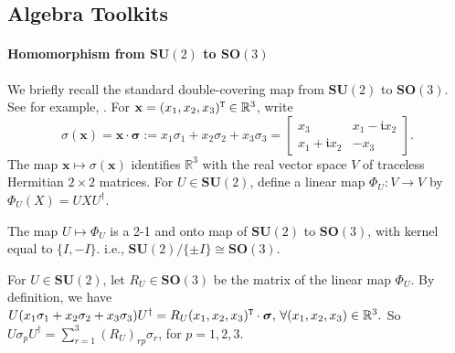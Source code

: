 
\subsection{Algebra Toolkits}
\paragraph{Homomorphism from $\mathbf{SU}(2)$ to $\mathbf{SO}(3)$}\label{para: SU2 and SO3}

We briefly recall the standard double-covering map from $\mathbf{SU}(2)$ to $\mathbf{SO}(3).$
See for example, \cite{Hall2015LieGroups}.
For $\mathbf{x}=(x_1,x_2,x_3)^{\tt T}\in\mathbb R^3$, write
\[
    \sigma(\mathbf{x})=\mathbf{x}\mathbin{\cdot}\boldsymbol{\sigma}
    :=x_1\sigma_1+x_2\sigma_2+x_3\sigma_3=\left[\begin{matrix}
        x_3 & x_1-\mathfrak{i}x_2\\
        x_1+ \mathfrak{i}x_2 & -x_3
    \end{matrix}\right].
\]
The map $\mathbf{x}\mapsto\sigma(\mathbf{x})$ identifies $\mathbb R^3$ with the real vector
space $V$ of traceless Hermitian $2\times 2$ matrices.  
For $U\in\mathbf{SU}(2)$, define a linear map $\Phi_U:V\to V$ by
$
    \Phi_U(X)=UXU^{\dagger}.
$

\begin{proposition}
    The map $U\mapsto \Phi_U$ is a 2-1 and onto map of $\mathbf{SU}(2)$ to $\mathbf{SO}(3)$, with kernel equal to $\{I,-I\}$. i.e., $\mathbf{SU}(2)/\{\pm I\}\cong \mathbf{SO}(3).$
\end{proposition}

For $U\in \mathbf{SU}(2)$, let $R_U\in \mathbf{SO}(3)$ be the matrix of the linear map $\Phi_U.$ 
By definition, we have $U(x_1\sigma_1+x_2\sigma_2+x_3\sigma_3)U^\dagger=R_U(x_1,x_2,x_3)^{\tt T}\cdot \boldsymbol{\sigma},\,\forall (x_1,x_2,x_3)\in \mathbb{R}^3.$
So $U\sigma_pU^{\dagger}=\sum_{r=1}^3(R_U)_{rp}\sigma_r$, for $p=1,2,3.$
